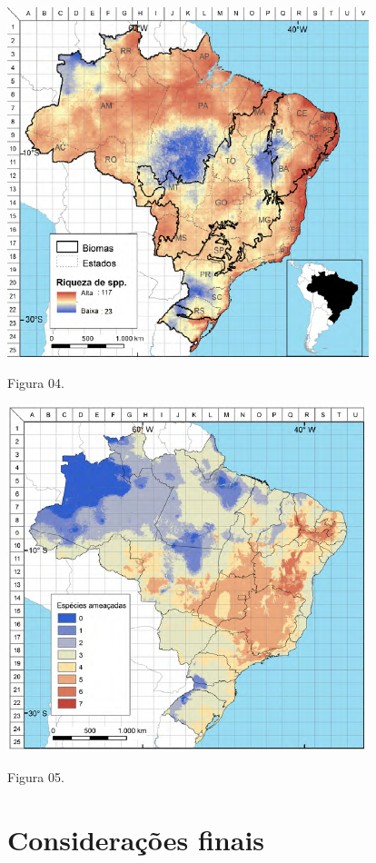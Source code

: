 \documentclass[
]{scrbook}
\begin{document}
\begin{center}\includegraphics[width=0.8\linewidth]{imagens/figura04} \end{center}

Figura 04.

\begin{center}\includegraphics[width=0.8\linewidth]{imagens/figura05} \end{center}

Figura 05.

\hypertarget{cons-finais-morcegos}{%
\section{Considerações finais}\label{cons-finais-morcegos}}
\end{document}
